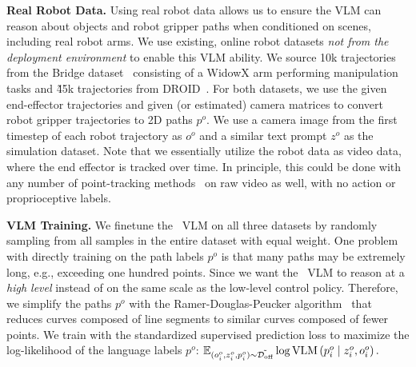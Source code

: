 \textbf{Real Robot Data.} Using real robot data allows us to ensure the VLM can reason about objects and robot gripper paths when conditioned on scenes, including real robot arms.
We use existing, online robot datasets \emph{not from the deployment environment} to enable this VLM ability.
We source 10k trajectories from the Bridge dataset~\citep{walke2023bridgedata, open_x_embodiment_rt_x_2023} consisting of a WidowX arm performing manipulation tasks and \~45k trajectories from DROID~\citep{khazatsky2024droid}. 
For both datasets, we use the given end-effector trajectories and given (or estimated) camera matrices to convert robot gripper trajectories to 2D paths $p^o$. We use a camera image from the first timestep of each robot trajectory as $o^o$ and a similar text prompt $z^o$ as the simulation dataset. Note that we essentially utilize the robot data as video data, where the end effector is tracked over time. In principle, this could be done with any number of point-tracking methods~\citep{doersch2023tapir} on raw video as well, with no action or proprioceptive labels. 

\textbf{VLM Training.}
We finetune the \method\ VLM on all three datasets by randomly sampling from all samples in the entire dataset with equal weight.
One problem with directly training on the path labels $p^o$ is that many paths may be extremely long, e.g., exceeding one hundred points. 
Since we want the \method\ VLM to reason at a \emph{high level} instead of on the same scale as the low-level control policy.
Therefore, we simplify the paths $p^o$ with the Ramer-Douglas-Peucker algorithm~\citep{RAMER1972244, douglas_pecker_1973} that reduces curves composed of line segments to similar curves composed of fewer points. 
We train with the standardized supervised prediction loss to maximize the log-likelihood of the language labels $p^o$:
$\mathbb{E}_{(o^o_i, z_i^o, p_i^o) \sim \Tilde{\mathcal{D}_\text{off}}}  \log \text{VLM} \left( p_i^o \mid z_i^o, o^o_i \right).$

